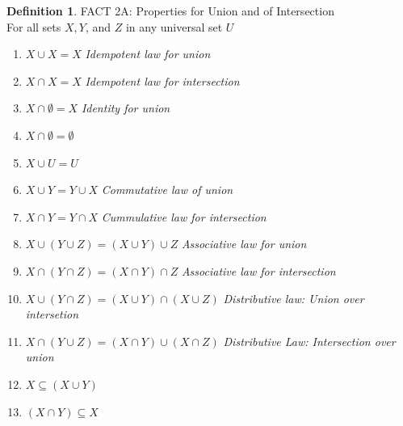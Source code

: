\documentclass{book}
\theoremstyle{definition}
\newtheorem{definition}{Definition}[section]
\theoremstyle{remark}
\begin{document}
\begin{definition}
FACT 2A: Properties for Union and of Intersection \\

For all sets $X, Y$, and $Z$ in any universal set $U$ \\
    
    \begin{enumerate}
        \item $X \cup X = X$ \textit{Idempotent law for union}
        \item $X \cap X = X$ \textit{Idempotent law for intersection}
        \item $X \cap \emptyset = X$ \textit{Identity for union}
        \item $X \cap \emptyset = \emptyset$
        \item $X \cup U = U$
        \item $X \cup Y = Y \cup X$ \textit{Commutative law of union}
        \item $X \cap Y = Y \cap X$ \textit{Cummulative law for intersection}
        \item $X \cup (Y \cup Z) = (X \cup Y) \cup Z$ \textit{Associative law for union}
        \item $X \cap (Y \cap Z) = (X \cap Y) \cap Z$ \textit{Associative law for intersection}
        \item $X \cup (Y \cap Z) = (X \cup Y) \cap (X \cup Z)$ \textit{Distributive law: Union over intersetion}
        \item $X \cap (Y \cup Z) = (X \cap Y) \cup (X \cap Z)$ \textit{Distributive Law: Intersection over union}
        \item $X \subseteq (X \cup Y)$
        \item $(X \cap Y) \subseteq X$
    \end{enumerate}
\end{definition}
\end{document}
